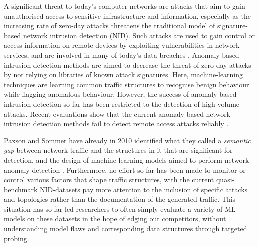 
A significant threat to today's computer networks are attacks that aim to gain unauthorised access to sensitive infrastructure and information, especially as the increasing rate of zero-day attacks \cite{zeroday} threatens the traditional model of signature-based network intrusion detection (NID). Such attacks are used to gain control or access information on remote devices by exploiting vulnerabilities in network services, and are involved in many of today's data breaches \cite{mandiant2015trends}.
Anomaly-based intrusion detection methods are aimed to decrease the threat of zero-day attacks by not relying on libraries of known attack signatures. Here, machine-learning techniques are learning common traffic structures to recognise benign behaviour while flagging anomalous behaviour. 
However, the success of anomaly-based intrusion detection so far has been restricted to the detection of high-volume attacks. Recent evaluations show that the current anomaly-based network intrusion detection methods fail to detect remote access attacks reliably \cite{nisioti2018intrusion}. 

Paxson and Sommer have already in 2010 identified what they called a \textit{semantic gap} between network traffic and the structures in it that are significant for detection, and the design of machine learning models aimed to perform network anomaly detection \cite{sommer_outside_2010}. Furthermore, no effort so far has been made to monitor or control various factors that shape traffic structures, with the current quasi-benchmark NID-datasets pay more attention to the inclusion of specific attacks and topologies rather than the documentation of the generated traffic. This situation has so far led researchers to often simply evaluate a variety of ML-models on these datasets in the hope of edging out competitors, without understanding model flaws and corresponding data structures through targeted probing.

